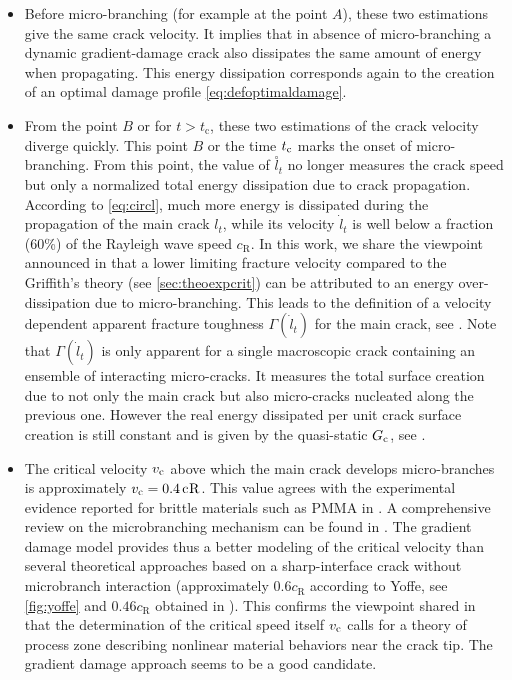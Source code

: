 \begin{itemize}
\item Before micro-branching (for example at the point $A$), these two estimations give the same crack velocity. It implies that in absence of micro-branching a dynamic gradient-damage crack also dissipates the same amount of energy when propagating. This energy dissipation corresponds again to the creation of an optimal damage profile \eqref{eq:defoptimaldamage}.

\item From the point $B$ or for $t>t_\mathrm{c}$, these two estimations of the crack velocity diverge quickly. This point $B$ or the time $t_{\mathrm{c}}$ marks the onset of micro-branching. From this point, the value of $\overset{\circ}{l}_t$ no longer measures the crack speed but only a normalized total energy dissipation due to crack propagation. According to \eqref{eq:circl}, much more energy is dissipated during the propagation of the main crack $l_t$, while its velocity $\dot{l}_t$ is well below a fraction (60\%) of the Rayleigh wave speed $c_\mathrm{R}$. In this work, we share the viewpoint announced in \cite{SharonFineberg:1996} that a lower limiting fracture velocity compared to the Griffith's theory (see \cref{sec:theoexpcrit}) can be attributed to an energy over-dissipation due to micro-branching. This leads to the definition of a velocity dependent apparent fracture toughness $\Gamma(\dot{l}_t)$ for the main crack, see \cite{SharonFineberg:1996,SharonFineberg:1999}. Note that $\Gamma(\dot{l}_t)$ is only apparent for a single macroscopic crack containing an ensemble of interacting micro-cracks. It measures the total surface creation due to not only the main crack but also micro-cracks nucleated along the previous one. However the real energy dissipated per unit crack surface creation is still constant and is given by the quasi-static $G_\mathrm{c}$, see \cite{SharonFineberg:1996}.

\item The critical velocity $v_{\mathrm{c}}$ above which the main crack develops micro-branches is approximately $v_{\mathrm{c}}=\SI{0.4}{c_\mathrm{R}}$. This value agrees with the experimental evidence reported for brittle materials such as PMMA in \cite{FinebergGrossMarderSwinney:1992a}. A comprehensive review on the microbranching mechanism can be found in \cite{FinebergMarder:1999}. The gradient damage model provides thus a better modeling of the critical velocity than several theoretical approaches based on a sharp-interface crack without microbranch interaction (approximately $0.6c_\mathrm{R}$ according to Yoffe, see \cref{fig:yoffe} and $0.46c_\mathrm{R}$ obtained in \cite{KatzavAdda-BediaArias:2007}). This confirms the viewpoint shared in \cite{Ravi-Chandar:1998} that the determination of the critical speed itself $v_{\mathrm{c}}$ calls for a theory of process zone describing nonlinear material behaviors near the crack tip. The gradient damage approach seems to be a good candidate.
\end{itemize}

